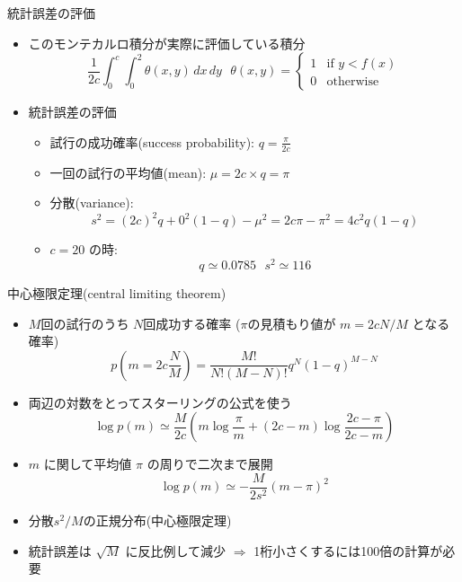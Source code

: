 \documentclass[dvipdfmx]{beamer}
\begin{document}
\begin{frame}[t,fragile]{統計誤差の評価}
  \begin{itemize}
    \setlength{\itemsep}{1em}
  \item このモンテカルロ積分が実際に評価している積分
    \[
    \frac{1}{2c} \int_0^c \!\! \int_0^2 \!\! \theta(x,y) \, dx \, dy
    \ \ \ \theta(x,y) = \begin{cases} 1 & \text{if $y < f(x)$} \\ 0 & \text{otherwise} \end{cases}
    \]
  \item 統計誤差の評価
    \begin{itemize}
      \item 試行の成功確率(success probability): $q=\frac{\pi}{2c}$
      \item 一回の試行の平均値(mean): $\mu = 2c \times q = \pi$
      \item 分散(variance):
        \[ s^2 = (2c)^2q + 0^2(1-q) - \mu^2 = 2c\pi-\pi^2 = 4c^2 q(1-q) \]
      \item $c=20$ の時:
        \[ q \simeq 0.0785 \ \ \ s^2 \simeq 116
        \]
    \end{itemize}
  \end{itemize}
\end{frame}

\begin{frame}[t,fragile]{中心極限定理(central limiting theorem)}
  \begin{itemize}
  \item $M$回の試行のうち $N$回成功する確率 ($\pi$の見積もり値が $m=2cN/M$ となる確率)
    \[
    p(m=2c\frac{N}{M}) = \frac{M!}{N!(M-N)!} q^N (1-q)^{M-N}
    \]
  \item 両辺の対数をとってスターリングの公式を使う
    \[
    \log p(m) \simeq \frac{M}{2c} (m \log \frac{\pi}{m} + (2c-m)\log \frac{2c-\pi}{2c-m})
    \]
  \item $m$ に関して平均値 $\pi$ の周りで二次まで展開
    \[
    \log p(m) \simeq -\frac{M}{2s^2}(m-\pi)^2
    \]
  \item 分散$s^2/M$の正規分布(中心極限定理)
  \item 統計誤差は $\sqrt{M}$ に反比例して減少 $\Rightarrow$ 1桁小さくするには100倍の計算が必要
  \end{itemize}
\end{frame}
\end{document}
